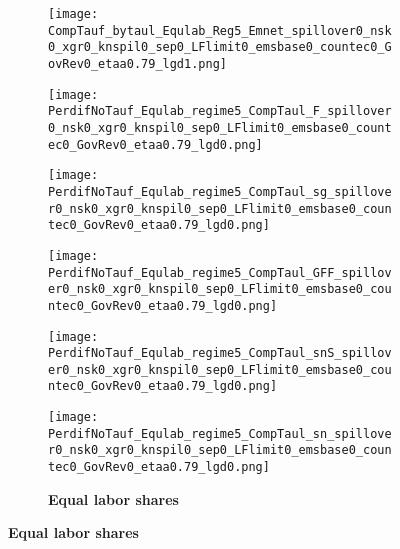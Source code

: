 \begin{figure}[h!!]
		\begin{subfigure}{0.75\textwidth}
			\caption{\textbf{Equal labor shares} }
			\begin{minipage}[]{0.32\textwidth}
				\texttt{[image: CompTauf\_bytaul\_Equlab\_Reg5\_Emnet\_spillover0\_nsk0\_xgr0\_knspil0\_sep0\_LFlimit0\_emsbase0\_countec0\_GovRev0\_etaa0.79\_lgd1.png]}
			\end{minipage}	
			\begin{minipage}[]{0.32\textwidth}
					\captionsetup{width=.45\linewidth}				\texttt{[image: PerdifNoTauf\_Equlab\_regime5\_CompTaul\_F\_spillover0\_nsk0\_xgr0\_knspil0\_sep0\_LFlimit0\_emsbase0\_countec0\_GovRev0\_etaa0.79\_lgd0.png]}
			\end{minipage}
			\begin{minipage}[]{0.32\textwidth}
			\captionsetup{width=.45\linewidth}				\texttt{[image: PerdifNoTauf\_Equlab\_regime5\_CompTaul\_sg\_spillover0\_nsk0\_xgr0\_knspil0\_sep0\_LFlimit0\_emsbase0\_countec0\_GovRev0\_etaa0.79\_lgd0.png]}
		\end{minipage}
			\begin{minipage}[]{0.32\textwidth}
				\texttt{[image: PerdifNoTauf\_Equlab\_regime5\_CompTaul\_GFF\_spillover0\_nsk0\_xgr0\_knspil0\_sep0\_LFlimit0\_emsbase0\_countec0\_GovRev0\_etaa0.79\_lgd0.png]}
			\end{minipage}
		\begin{minipage}[]{0.32\textwidth}
		\texttt{[image: PerdifNoTauf\_Equlab\_regime5\_CompTaul\_snS\_spillover0\_nsk0\_xgr0\_knspil0\_sep0\_LFlimit0\_emsbase0\_countec0\_GovRev0\_etaa0.79\_lgd0.png]}
	\end{minipage}
\begin{minipage}[]{0.32\textwidth}
\texttt{[image: PerdifNoTauf\_Equlab\_regime5\_CompTaul\_sn\_spillover0\_nsk0\_xgr0\_knspil0\_sep0\_LFlimit0\_emsbase0\_countec0\_GovRev0\_etaa0.79\_lgd0.png]}
\end{minipage}
		\end{subfigure} 
		

\end{figure}
